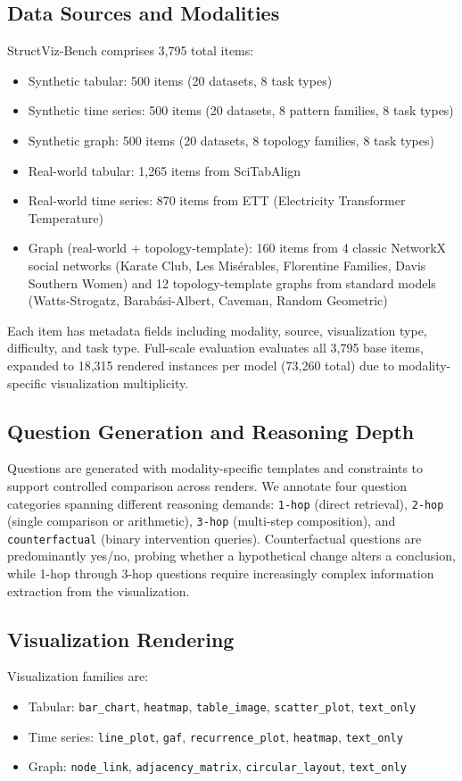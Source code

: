 \documentclass{article}
\begin{document}
\subsection{Data Sources and Modalities}
StructViz-Bench comprises 3,795 total items:
\begin{itemize}[leftmargin=1.5em]
    \item Synthetic tabular: 500 items (20 datasets, 8 task types)
    \item Synthetic time series: 500 items (20 datasets, 8 pattern families, 8 task types)
    \item Synthetic graph: 500 items (20 datasets, 8 topology families, 8 task types)
    \item Real-world tabular: 1,265 items from SciTabAlign
    \item Real-world time series: 870 items from ETT (Electricity Transformer Temperature)
    \item Graph (real-world + topology-template): 160 items from 4 classic NetworkX social networks (Karate Club, Les Mis\'{e}rables, Florentine Families, Davis Southern Women) and 12 topology-template graphs from standard models (Watts-Strogatz, Barab\'{a}si-Albert, Caveman, Random Geometric)
\end{itemize}

Each item has metadata fields including modality, source, visualization type, difficulty, and task type. Full-scale evaluation evaluates all 3,795 base items, expanded to 18,315 rendered instances per model (73,260 total) due to modality-specific visualization multiplicity.

\subsection{Question Generation and Reasoning Depth}
Questions are generated with modality-specific templates and constraints to support controlled comparison across renders. We annotate four question categories spanning different reasoning demands: \texttt{1-hop} (direct retrieval), \texttt{2-hop} (single comparison or arithmetic), \texttt{3-hop} (multi-step composition), and \texttt{counterfactual} (binary intervention queries). Counterfactual questions are predominantly yes/no, probing whether a hypothetical change alters a conclusion, while 1-hop through 3-hop questions require increasingly complex information extraction from the visualization.

\subsection{Visualization Rendering}
Visualization families are:
\begin{itemize}[leftmargin=1.5em]
    \item Tabular: \texttt{bar\_chart}, \texttt{heatmap}, \texttt{table\_image}, \texttt{scatter\_plot}, \texttt{text\_only}
    \item Time series: \texttt{line\_plot}, \texttt{gaf}, \texttt{recurrence\_plot}, \texttt{heatmap}, \texttt{text\_only}
    \item Graph: \texttt{node\_link}, \texttt{adjacency\_matrix}, \texttt{circular\_layout}, \texttt{text\_only}
\end{itemize}
\end{document}
